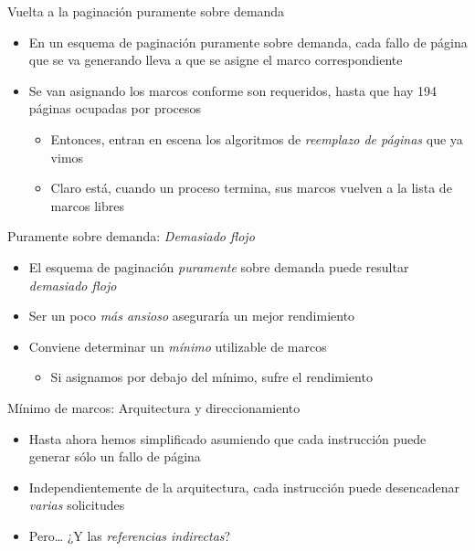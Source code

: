 \documentclass[presentation]{beamer}
\newcommand{\rarrow}{$\rightarrow$\hskip 0.5em}
\begin{document}
\begin{frame}[label={sec:orgec16249}]{Vuelta a la paginación puramente sobre demanda}
\begin{itemize}
\item En un esquema de paginación puramente sobre demanda, cada fallo de
página que se va generando lleva a que se asigne el marco
correspondiente
\item Se van asignando los marcos conforme son requeridos, hasta que hay
194 páginas ocupadas por procesos
\begin{itemize}
\item Entonces, entran en escena los algoritmos de \emph{reemplazo de
páginas} que ya vimos
\item Claro está, cuando un proceso termina, sus marcos vuelven a la
lista de marcos libres
\end{itemize}
\end{itemize}
\end{frame}

\begin{frame}[label={sec:org377ea1e}]{Puramente sobre demanda: \emph{Demasiado flojo}}
\begin{itemize}
\item El esquema de paginación \emph{puramente} sobre demanda puede resultar
\emph{demasiado flojo}
\item Ser un poco \emph{más ansioso} aseguraría un mejor rendimiento
\item Conviene determinar un \emph{mínimo} utilizable de marcos
\begin{itemize}
\item Si asignamos por debajo del mínimo, sufre el rendimiento
\end{itemize}
\end{itemize}
\end{frame}

\begin{frame}[label={sec:org29a84e7},fragile]{Mínimo de marcos: Arquitectura y direccionamiento}
 \begin{itemize}
\item Hasta ahora hemos simplificado asumiendo que cada instrucción puede
generar sólo un fallo de página
\item Independientemente de la arquitectura, cada instrucción puede
desencadenar \emph{varias} solicitudes
\item Pero\ldots{} ¿Y las \emph{referencias indirectas}?
\end{itemize}
\end{frame}
\end{document}

